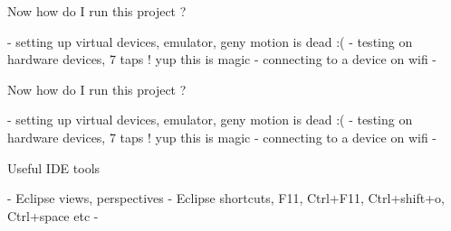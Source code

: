 \documentclass[11pt]{beamer}
\begin{document}
\begin{frame}[containsverbatim]{Now how do I run this project ?}

- setting up virtual devices, emulator, geny motion is dead :(
- testing on hardware devices, 7 taps ! yup this is magic
- connecting to a device on wifi 
- 
\end{frame}

\begin{frame}[containsverbatim]{Now how do I run this project ?}

- setting up virtual devices, emulator, geny motion is dead :(
- testing on hardware devices, 7 taps ! yup this is magic
- connecting to a device on wifi 
- 
\end{frame}


\begin{frame}[containsverbatim]{Useful IDE tools}

- Eclipse views, perspectives
- Eclipse shortcuts, F11, Ctrl+F11, Ctrl+shift+o, Ctrl+space etc
- 

\end{frame}
\end{document}
